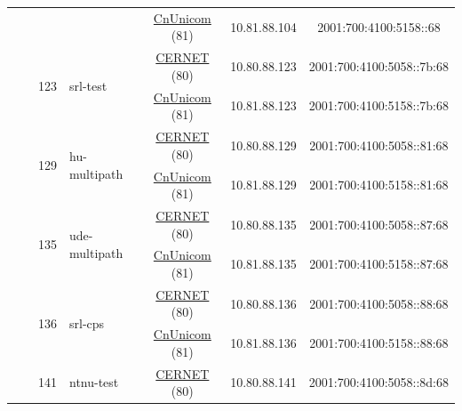 \begin{small}
\begin{center}
\begin{longtable}{|c|c|c|c|c|c|c|c|}
  &  & \multicolumn{2}{|c|}{} & \multicolumn{2}{|c|}{\tiny{\href{http://www.chinaunicom.com}{CnUnicom} (81)}} & \tiny{10.81.88.104} & \tiny{2001:700:4100:5158::68} \\* \cline{3-3}\cline{4-4}\cline{5-5}\cline{6-6}\cline{7-7}\cline{8-8}
  &  & \multirow{2}{*}{\tiny{123}} & \multicolumn{1}{|l|}{\multirow{2}{*}{\tiny{srl-test}}} & \multicolumn{2}{|c|}{\tiny{\href{http://www.cernet.edu.cn}{CERNET} (80)}} & \tiny{10.80.88.123} & \tiny{2001:700:4100:5058::7b:68} \\* \cline{5-5}\cline{6-6}\cline{7-7}\cline{8-8}
  &  &  &  & \multicolumn{2}{|c|}{\tiny{\href{http://www.chinaunicom.com}{CnUnicom} (81)}} & \tiny{10.81.88.123} & \tiny{2001:700:4100:5158::7b:68} \\* \cline{3-3}\cline{4-4}\cline{5-5}\cline{6-6}\cline{7-7}\cline{8-8}
  &  & \multirow{2}{*}{\tiny{129}} & \multicolumn{1}{|l|}{\multirow{2}{*}{\tiny{hu-multipath}}} & \multicolumn{2}{|c|}{\tiny{\href{http://www.cernet.edu.cn}{CERNET} (80)}} & \tiny{10.80.88.129} & \tiny{2001:700:4100:5058::81:68} \\* \cline{5-5}\cline{6-6}\cline{7-7}\cline{8-8}
  &  &  &  & \multicolumn{2}{|c|}{\tiny{\href{http://www.chinaunicom.com}{CnUnicom} (81)}} & \tiny{10.81.88.129} & \tiny{2001:700:4100:5158::81:68} \\* \cline{3-3}\cline{4-4}\cline{5-5}\cline{6-6}\cline{7-7}\cline{8-8}
  &  & \multirow{2}{*}{\tiny{135}} & \multicolumn{1}{|l|}{\multirow{2}{*}{\tiny{ude-multipath}}} & \multicolumn{2}{|c|}{\tiny{\href{http://www.cernet.edu.cn}{CERNET} (80)}} & \tiny{10.80.88.135} & \tiny{2001:700:4100:5058::87:68} \\* \cline{5-5}\cline{6-6}\cline{7-7}\cline{8-8}
  &  &  &  & \multicolumn{2}{|c|}{\tiny{\href{http://www.chinaunicom.com}{CnUnicom} (81)}} & \tiny{10.81.88.135} & \tiny{2001:700:4100:5158::87:68} \\* \cline{3-3}\cline{4-4}\cline{5-5}\cline{6-6}\cline{7-7}\cline{8-8}
  &  & \multirow{2}{*}{\tiny{136}} & \multicolumn{1}{|l|}{\multirow{2}{*}{\tiny{srl-cps}}} & \multicolumn{2}{|c|}{\tiny{\href{http://www.cernet.edu.cn}{CERNET} (80)}} & \tiny{10.80.88.136} & \tiny{2001:700:4100:5058::88:68} \\* \cline{5-5}\cline{6-6}\cline{7-7}\cline{8-8}
  &  &  &  & \multicolumn{2}{|c|}{\tiny{\href{http://www.chinaunicom.com}{CnUnicom} (81)}} & \tiny{10.81.88.136} & \tiny{2001:700:4100:5158::88:68} \\* \cline{3-3}\cline{4-4}\cline{5-5}\cline{6-6}\cline{7-7}\cline{8-8}
  &  & \multirow{2}{*}{\tiny{141}} & \multicolumn{1}{|l|}{\multirow{2}{*}{\tiny{ntnu-test}}} & \multicolumn{2}{|c|}{\tiny{\href{http://www.cernet.edu.cn}{CERNET} (80)}} & \tiny{10.80.88.141} & \tiny{2001:700:4100:5058::8d:68} \\* \cline{5-5}\cline{6-6}\cline{7-7}\cline{8-8}

\end{longtable}
\end{center}
\end{small}
